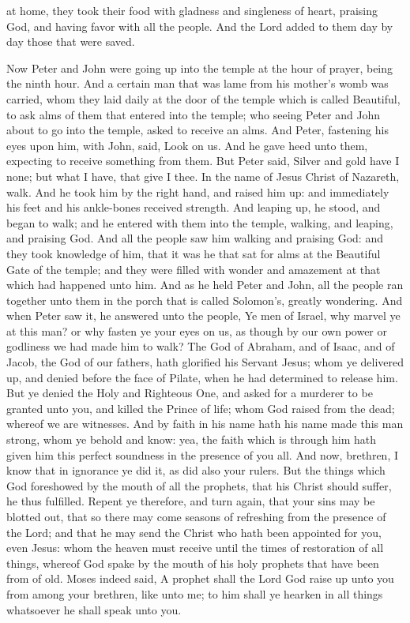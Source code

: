 at home, they took their food with gladness and singleness of heart, praising God, and having favor with all the people. And the Lord added to them day by day those that were saved. 

Now Peter and John were going up into the temple at the hour of prayer, being the ninth hour. And a certain man that was lame from his mother’s womb was carried, whom they laid daily at the door of the temple which is called Beautiful, to ask alms of them that entered into the temple; who seeing Peter and John about to go into the temple, asked to receive an alms. And Peter, fastening his eyes upon him, with John, said, Look on us. And he gave heed unto them, expecting to receive something from them. But Peter said, Silver and gold have I none; but what I have, that give I thee. In the name of Jesus Christ of Nazareth, walk. And he took him by the right hand, and raised him up: and immediately his feet and his ankle-bones received strength. And leaping up, he stood, and began to walk; and he entered with them into the temple, walking, and leaping, and praising God. And all the people saw him walking and praising God: and they took knowledge of him, that it was he that sat for alms at the Beautiful Gate of the temple; and they were filled with wonder and amazement at that which had happened unto him.  And as he held Peter and John, all the people ran together unto them in the porch that is called Solomon’s, greatly wondering. And when Peter saw it, he answered unto the people, Ye men of Israel, why marvel ye at this man? or why fasten ye your eyes on us, as though by our own power or godliness we had made him to walk? The God of Abraham, and of Isaac, and of Jacob, the God of our fathers, hath glorified his Servant Jesus; whom ye delivered up, and denied before the face of Pilate, when he had determined to release him. But ye denied the Holy and Righteous One, and asked for a murderer to be granted unto you, and killed the Prince of life; whom God raised from the dead; whereof we are witnesses. And by faith in his name hath his name made this man strong, whom ye behold and know: yea, the faith which is through him hath given him this perfect soundness in the presence of you all. And now, brethren, I know that in ignorance ye did it, as did also your rulers. But the things which God foreshowed by the mouth of all the prophets, that his Christ should suffer, he thus fulfilled. Repent ye therefore, and turn again, that your sins may be blotted out, that so there may come seasons of refreshing from the presence of the Lord; and that he may send the Christ who hath been appointed for you, even Jesus: whom the heaven must receive until the times of restoration of all things, whereof God spake by the mouth of his holy prophets that have been from of old. Moses indeed said, A prophet shall the Lord God raise up unto you from among your brethren, like unto me; to him shall ye hearken in all things whatsoever he shall speak unto you. 